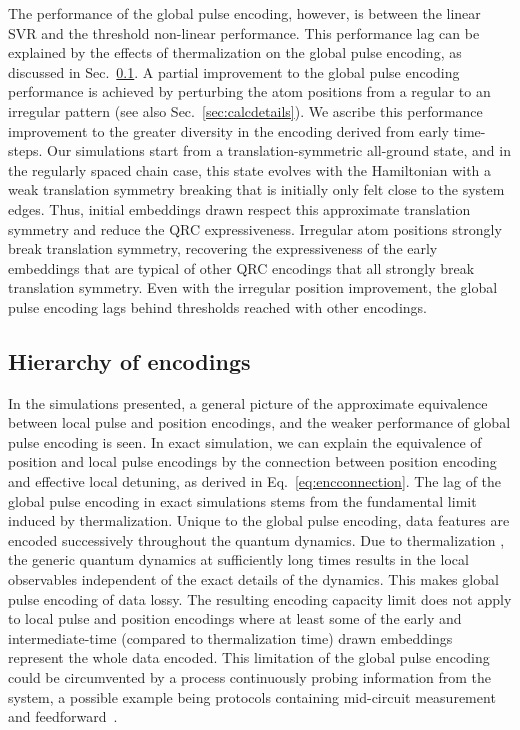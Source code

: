 \documentclass[english,floatfix,twocolumn,showpacs, aps, prx, reprint, superscriptaddress, longbibliography]{revtex4-2}
\begin{document}
 The performance of the global pulse encoding, however, is between the linear SVR and the threshold non-linear performance. This performance lag can be explained by the effects of thermalization on the global pulse encoding, as discussed in Sec.~\ref{sec:hierarchy}. A partial improvement to the global pulse encoding performance is achieved by perturbing the atom positions from a regular to an irregular pattern (see also Sec.~\ref{sec:calcdetails}). We ascribe this performance improvement to the greater diversity in the encoding derived from early time-steps. Our simulations start from a translation-symmetric all-ground state, and in the regularly spaced chain case, this state evolves with the Hamiltonian with a weak translation symmetry breaking that is initially only felt close to the system edges. Thus, initial embeddings drawn respect this approximate translation symmetry and reduce the QRC expressiveness. Irregular atom positions strongly break translation symmetry, recovering the expressiveness of the early embeddings that are typical of other QRC encodings that all strongly break translation symmetry. Even with the irregular position improvement, the global pulse encoding lags behind thresholds reached with other encodings. 
 
\subsection{Hierarchy of encodings}
\label{sec:hierarchy}

In the simulations presented, a general picture of the approximate equivalence between local pulse and position encodings, and the weaker performance of global pulse encoding is seen. In exact simulation, we can explain the equivalence of position and local pulse encodings by the connection between position encoding and effective local detuning, as derived in Eq.~\ref{eq:encconnection}. The lag of the global pulse encoding in exact simulations stems from the fundamental limit induced by thermalization. Unique to the global pulse encoding, data features are encoded successively throughout the quantum dynamics. Due to thermalization \cite{Deutsch_2018}, the generic quantum dynamics at sufficiently long times results in the local observables independent of the exact details of the dynamics. This makes global pulse encoding of data lossy. The resulting encoding capacity limit does not apply to local pulse and position encodings where at least some of the early and intermediate-time (compared to thermalization time) drawn embeddings represent the whole data encoded. This limitation of the global pulse encoding could be circumvented by a process continuously probing information from the system, a possible example being protocols containing mid-circuit measurement and feedforward~\cite{Bravo2022}.
\end{document}
